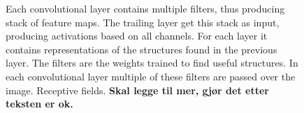 \begin{figure}
\begin{tikzpicture}[scale=1.7,every node/.style={minimum size=1cm},on grid]
     
    
    \end{tikzpicture}    \caption{ Each convolutional layer contains multiple filters, thus producing stack of feature maps. The trailing layer get this stack as input, producing activations based on all channels. For each layer it contains representations of the structures found in the previous layer. The filters are the weights trained to find useful structures. In each convolutional layer multiple of these filters are passed over the image.
    Receptive fields. \textbf{Skal legge til mer, gjør det etter teksten er ok.}}
    \label{fig:conv_layers}
\end{figure} 
 